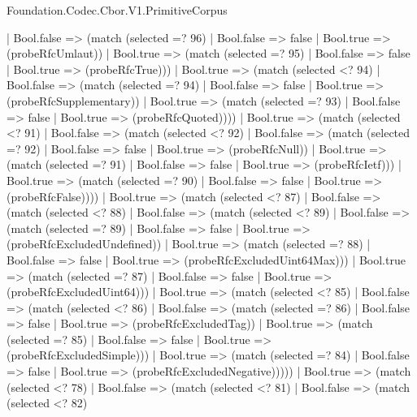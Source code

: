 \begin{lexlean}{Foundation.Codec.Cbor.V1.PrimitiveCorpus}
\begin{semanticmodule}
{                  | Bool.false => (match (selected =? 96)
                    | Bool.false => false
                    | Bool.true => (probeRfcUmlaut))
                  | Bool.true => (match (selected =? 95)
                    | Bool.false => false
                    | Bool.true => (probeRfcTrue)))
                | Bool.true => (match (selected <? 94)
                  | Bool.false => (match (selected =? 94)
                    | Bool.false => false
                    | Bool.true => (probeRfcSupplementary))
                  | Bool.true => (match (selected =? 93)
                    | Bool.false => false
                    | Bool.true => (probeRfcQuoted))))
              | Bool.true => (match (selected <? 91)
                | Bool.false => (match (selected <? 92)
                  | Bool.false => (match (selected =? 92)
                    | Bool.false => false
                    | Bool.true => (probeRfcNull))
                  | Bool.true => (match (selected =? 91)
                    | Bool.false => false
                    | Bool.true => (probeRfcIetf)))
                | Bool.true => (match (selected =? 90)
                  | Bool.false => false
                  | Bool.true => (probeRfcFalse))))
            | Bool.true => (match (selected <? 87)
              | Bool.false => (match (selected <? 88)
                | Bool.false => (match (selected <? 89)
                  | Bool.false => (match (selected =? 89)
                    | Bool.false => false
                    | Bool.true => (probeRfcExcludedUndefined))
                  | Bool.true => (match (selected =? 88)
                    | Bool.false => false
                    | Bool.true => (probeRfcExcludedUint64Max)))
                | Bool.true => (match (selected =? 87)
                  | Bool.false => false
                  | Bool.true => (probeRfcExcludedUint64)))
              | Bool.true => (match (selected <? 85)
                | Bool.false => (match (selected <? 86)
                  | Bool.false => (match (selected =? 86)
                    | Bool.false => false
                    | Bool.true => (probeRfcExcludedTag))
                  | Bool.true => (match (selected =? 85)
                    | Bool.false => false
                    | Bool.true => (probeRfcExcludedSimple)))
                | Bool.true => (match (selected =? 84)
                  | Bool.false => false
                  | Bool.true => (probeRfcExcludedNegative)))))
          | Bool.true => (match (selected <? 78)
            | Bool.false => (match (selected <? 81)
              | Bool.false => (match (selected <? 82)
}
\end{semanticmodule}
\end{lexlean}
